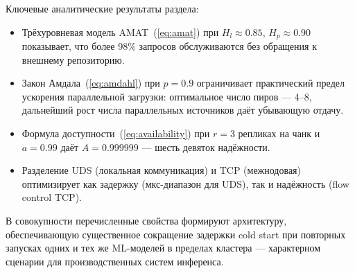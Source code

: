 Ключевые аналитические результаты раздела:
\begin{itemize}[leftmargin=*]
  \item Трёхуровневая модель AMAT~(\ref{eq:amat}) при $H_l \approx 0.85$, $H_p \approx 0.90$ показывает, что более 98\% запросов обслуживаются без обращения к внешнему репозиторию.
  \item Закон Амдала~(\ref{eq:amdahl}) при $p = 0.9$ ограничивает практический предел ускорения параллельной загрузки: оптимальное число пиров --- 4--8, дальнейший рост числа параллельных источников даёт убывающую отдачу.
  \item Формула доступности~(\ref{eq:availability}) при $r = 3$ репликах на чанк и $a = 0.99$ даёт $A = 0.999999$ --- шесть девяток надёжности.
  \item Разделение UDS (локальная коммуникация) и TCP (межнодовая) оптимизирует как задержку (мкс-диапазон для UDS), так и надёжность (flow control TCP).
\end{itemize}

В совокупности перечисленные свойства формируют архитектуру, обеспечивающую существенное сокращение задержки cold start при повторных запусках одних и тех же ML-моделей в пределах кластера --- характерном сценарии для производственных систем инференса.
